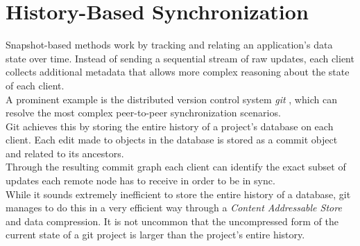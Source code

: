 \section{History-Based Synchronization}
\label{sec:background.history-based}
Snapshot-based methods work by tracking and relating an application's data state over time.
Instead of sending a sequential stream of raw updates, each client collects additional metadata that allows more complex reasoning about the state of each client.\\
A prominent example is the distributed version control system \emph{git} \cite{swicegood2008pragmatic}, which can resolve the most complex peer-to-peer synchronization scenarios.\\
Git achieves this by storing the entire history of a project's database on each client.
Each edit made to objects in the database is stored as a commit object and related to its ancestors.\\
Through the resulting commit graph each client can identify the exact subset of updates each remote node has to receive in order to be in sync.\\
While it sounds extremely inefficient to store the entire history of a database, git manages to do this in a very efficient way through a \emph{Content Addressable Store} and data compression.
It is not uncommon that the uncompressed form of the current state of a git project is larger than the project's entire history.

